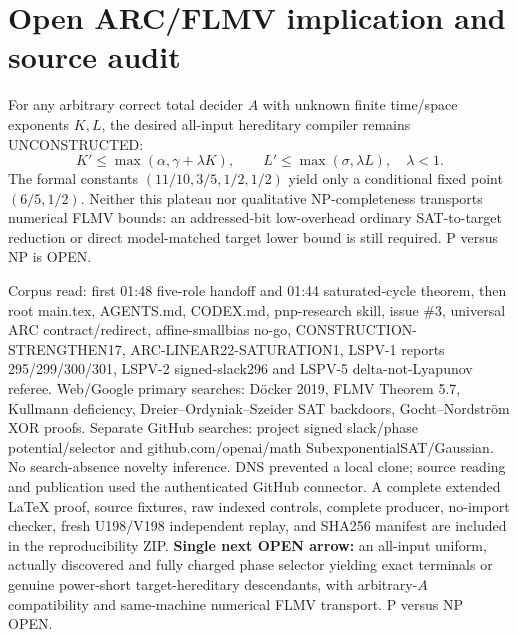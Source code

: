 \documentclass[11pt]{article}
\begin{document}
\section{Open ARC/FLMV implication and source audit}
For any arbitrary correct total decider $A$ with unknown finite time/space exponents $K,L$, the desired all-input hereditary compiler remains UNCONSTRUCTED:
\[
K'\le\max(\alpha,\gamma+\lambda K),\qquad L'\le\max(\sigma,\lambda L),\quad \lambda<1.
\]
The formal constants $(11/10,3/5,1/2,1/2)$ yield only a conditional fixed point $(6/5,1/2)$. Neither this plateau nor qualitative NP-completeness transports numerical FLMV bounds: an addressed-bit low-overhead ordinary SAT-to-target reduction or direct model-matched target lower bound is still required. P versus NP is OPEN.

Corpus read: first 01:48 five-role handoff and 01:44 saturated-cycle theorem, then root main.tex, AGENTS.md, CODEX.md, pnp-research skill, issue \#3, universal ARC contract/redirect, affine-smallbias no-go, CONSTRUCTION-STRENGTHEN17, ARC-LINEAR22-SATURATION1, LSPV-1 reports 295/299/300/301, LSPV-2 signed-slack296 and LSPV-5 delta-not-Lyapunov referee. Web/Google primary searches: D\"ocker 2019, FLMV Theorem 5.7, Kullmann deficiency, Dreier--Ordyniak--Szeider SAT backdoors, Gocht--Nordstr\"om XOR proofs. Separate GitHub searches: project signed slack/phase potential/selector and github.com/openai/math SubexponentialSAT/Gaussian. No search-absence novelty inference. DNS prevented a local clone; source reading and publication used the authenticated GitHub connector. A complete extended LaTeX proof, source fixtures, raw indexed controls, complete producer, no-import checker, fresh U198/V198 independent replay, and SHA256 manifest are included in the reproducibility ZIP.
\noindent\textbf{Single next OPEN arrow:} an all-input uniform, actually discovered and fully charged phase selector yielding exact terminals or genuine power-short target-hereditary descendants, with arbitrary-$A$ compatibility and same-machine numerical FLMV transport. P versus NP OPEN.


\end{document}
